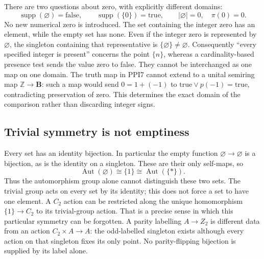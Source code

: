There are two questions about zero, with explicitly different
domains:
\begin{equation}\tag{PPI8}
\operatorname{supp}(\varnothing)=\mathrm{false},\qquad
\operatorname{supp}(\{0\})=\mathrm{true},\qquad
|\varnothing|=0,\quad\pi(0)=0.
\end{equation}
No new numerical zero is introduced. The set containing the
integer zero has an element, while the empty set has none.
Even if the integer zero is represented by $\varnothing$, the
singleton containing that representative is
$\{\varnothing\}\ne\varnothing$. Consequently ``every specified
integer is present'' concerns the point $\{n\}$, whereas a
cardinality-based presence test sends the value zero to false.
They cannot be interchanged as one map on one domain.
The truth map in PPI7 cannot extend to a unital semiring map
$\mathbb Z\to\mathbf B$: such a map would send
$0=1+(-1)$ to $\mathrm{true}\vee p(-1)=\mathrm{true}$,
contradicting preservation of zero. This determines the exact
domain of the comparison rather than discarding integer signs.

\subsection{Trivial symmetry is not emptiness}
Every set has an identity bijection. In particular the empty
function $\varnothing\to\varnothing$ is a bijection, as is the
identity on a singleton. These are their only self-maps, so
\begin{equation}\tag{PPI9}
\operatorname{Aut}(\varnothing)\cong\{1\}
\cong\operatorname{Aut}(\{*\}).
\end{equation}
Thus the automorphism group alone cannot distinguish these two
sets. The trivial group acts on every set by its identity; this
does not force a set to have one element. A $C_2$ action can be
restricted along the unique homomorphism $\{1\}\to C_2$ to its
trivial-group action. That is a precise sense in which this
particular symmetry can be forgotten. A parity labelling
$A\to Z_2$ is different data from an action $C_2\times A\to A$:
the odd-labelled singleton exists although every action on that
singleton fixes its only point. No parity-flipping bijection is
supplied by its label alone.

